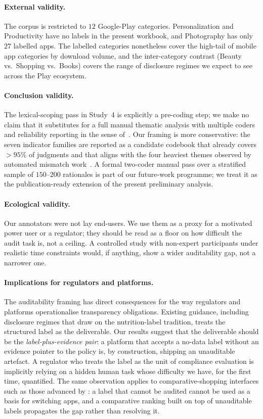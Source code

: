 \documentclass[11pt,a4paper]{article}
\begin{document}
\paragraph{External validity.}
The corpus is restricted to $12$ Google-Play categories. Personalization
and Productivity have no labels in the present workbook, and Photography
has only $27$ labelled apps. The labelled categories nonetheless cover
the high-tail of mobile app categories by download volume, and the
inter-category contrast (Beauty vs.\ Shopping vs.\ Books) covers the
range of disclosure regimes we expect to see across the Play ecosystem.

\paragraph{Conclusion validity.}
The lexical-scoping pass in Study~4 is explicitly a pre-coding step;
we make no claim that it substitutes for a full manual thematic
analysis with multiple coders and reliability reporting in the sense
of~\citet{braun2006using}. Our framing is more conservative: the
seven indicator families are reported as a candidate codebook that
already covers $>95\%$ of judgments and that aligns with the four
heaviest themes observed by automated mismatch
work~\citep{andow2019policylint,andow2020policheck}. A formal
two-coder manual pass over a stratified sample of $150\text{--}200$
rationales is part of our future-work programme; we treat it as the
publication-ready extension of the present preliminary analysis.

\paragraph{Ecological validity.}
Our annotators were not lay end-users. We use them as a proxy for a
motivated power user or a regulator; they should be read as a floor on
how difficult the audit task is, not a ceiling. A controlled study
with non-expert participants under realistic time constraints would,
if anything, show a wider auditability gap, not a narrower one.

\paragraph{Implications for regulators and platforms.}
The auditability framing has direct consequences for the way
regulators and platforms operationalise transparency obligations.
Existing guidance, including disclosure regimes that draw on the
nutrition-label tradition, treats the structured label as the
deliverable. Our results suggest that the deliverable should be the
\emph{label-plus-evidence pair}: a platform that accepts a no-data
label without an evidence pointer to the policy is, by construction,
shipping an unauditable artefact. A regulator who treats the label as
the unit of compliance evaluation is implicitly relying on a hidden
human task whose difficulty we have, for the first time, quantified.
The same observation applies to comparative-shopping interfaces such
as those advanced by \citet{tsai2011effect}: a label that cannot be
audited cannot be used as a basis for switching apps, and a comparative
ranking built on top of unauditable labels propagates the gap rather
than resolving it.
\end{document}
